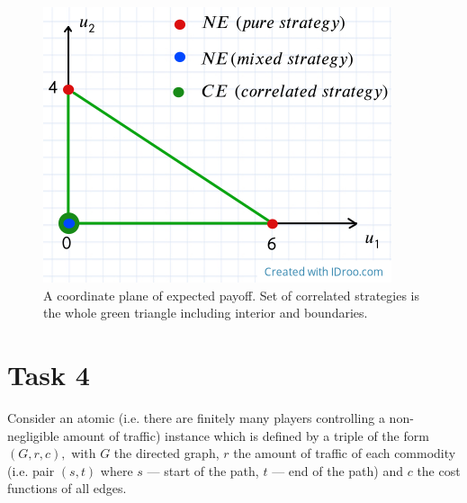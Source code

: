 \documentclass[a4paper, 12pt]{article}
\begin{document}
\begin{figure}[H]
\centering
\includegraphics[width=\textwidth]{Images/Task3.png}
\caption{A coordinate plane of expected payoff. Set of correlated strategies is the whole green triangle including interior and boundaries.}
\end{figure}
\section{Task 4}
Consider an atomic (i.e. there
are finitely many players controlling a non-negligible amount of traffic) instance which is defined by a triple of the form $(G, r, c),$ with $G$ the directed graph, $r$ the amount of traffic of each
commodity (i.e. pair $(s, t)$ where $s$ --- start of the path, $t$ --- end of the path) and $c$ the cost functions of all edges. 
\end{document}
